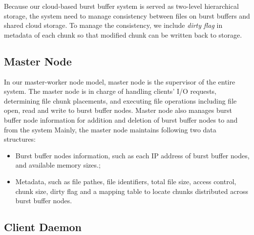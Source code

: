 Because our cloud-based burst buffer system is served as two-level hierarchical
storage, the system need to manage consistency between files on burst buffers
and shared cloud storage. 
To manage the consistency, we include \emph{dirty flag} in metadata of each
chunk so that modified chunk can be written back to storage.



\subsection{Master Node}
In our master-worker node model, master node is the supervisor of the entire
system. 
The master node is in charge of handling clients' I/O requests, determining file
chunk placements, and executing file operations including file open, read
and write to burst buffer nodes.
Master node also manages burst buffer node information for addition and deletion
of burst buffer nodes to and from the system
Mainly, the master node maintains following two data structures:
\begin{itemize}
  \item Burst buffer nodes information, such as each IP address of burst buffer
  nodes, and available memory sizes.; 
  \item Metadata, such as file pathes, file identifiers, total file size, access
  control, chunk size, dirty flag and a mapping table to locate chunks
  distributed across burst buffer nodes.
\end{itemize}


\subsection{Client Daemon}

